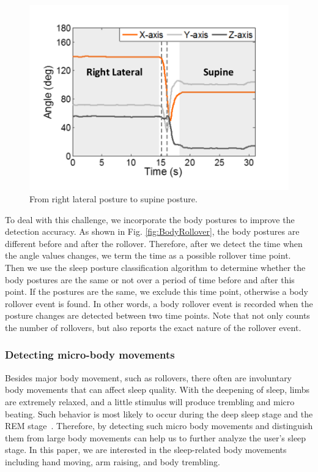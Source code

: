\begin{figure}[!t]
\begin{minipage}[t]{0.31\linewidth}
    \includegraphics[width=0.97\linewidth]{Figures/RightToSupine.pdf}\centering
  \caption{From right lateral posture to supine posture.}\label{fig:RightToLeft}
\end{minipage}
\end{figure}

To deal with this challenge, we incorporate the body postures to improve the detection accuracy. As shown in Fig. \ref{fig:BodyRollover},
the body postures are different before and after the rollover. Therefore, after we detect the time when the angle values changes, we term
the time as a possible rollover time point. Then we use the sleep posture classification algorithm to determine whether the body postures
are the same or not over a period of time before and after this point. If the postures are the same, we exclude this time
point, otherwise a body rollover event is found. In other words, a body rollover event is recorded when the posture changes are detected
between two time points. Note that {\systemname} not only counts the number of rollovers, but also reports the exact nature of the
rollover event.


\subsubsection{Detecting micro-body movements \label{sec:microbo}}

Besides major body movement, such as rollovers, there often are involuntary body movements that can affect sleep quality. With the deepening of sleep, limbs are extremely relaxed, and a little stimulus will produce trembling and micro beating. Such behavior is most likely to occur during the deep sleep stage and the REM stage~\cite{ancoli2003role,Jean2000Sleep}. Therefore, by detecting such micro body movements and distinguish them from large body movements can help us to further analyze the user's sleep stage. In this paper, we are interested in the sleep-related body movements including hand moving, arm raising, and body trembling.

